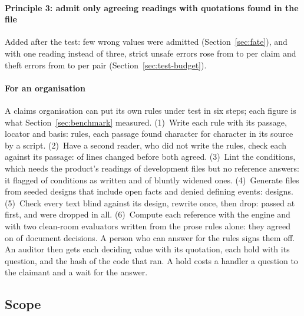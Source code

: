\paragraph{Principle 3: admit only agreeing readings with quotations found in the file}
Added after the test: few wrong values were admitted (Section~\ref{sec:fate}), and with one reading instead of three, strict unsafe errors rose from \sthreeFFourTenKThreeErrors{} to \sthreeFFourTenKOneErrors{} per claim and theft errors from \sthreeFFourThKThreeErrors{} to \sthreeFFourThKOneErrors{} per pair (Section~\ref{sec:test-budget}).

\paragraph{For an organisation}
A claims organisation can put its own rules under test in six steps; each figure is what Section~\ref{sec:benchmark} measured. (1)~Write each rule with its passage, locator and basis: \sfourdevAllRules{} rules, each passage found character for character in its source by a script. (2)~Have a second reader, who did not write the rules, check each against its passage: \sfourdevAllCheckNotAgree{} of \sfourdevAllCheckLines{} lines changed before both agreed. (3)~Lint the conditions, which needs the product's readings of development files but no reference answers: it flagged \sfourdevLintUntouchedFlagged{} of \sfourdevLintUntouched{} conditions as written and \sfourdevLintBluntDetected{} of \sfourdevLintBluntPlanted{} bluntly widened ones. (4)~Generate files from seeded designs that include open facts and denied defining events: \sfourdevAllDesigned{} designs. (5)~Check every text blind against its design, rewrite once, then drop: \sfourdevAllOneKept{} passed at first, and \sfourdevAllDropped{} were dropped in all. (6)~Compute each reference with the engine and with two clean-room evaluators written from the prose rules alone: they agreed on \sfourdevCleanroomSame{} of \sfourdevCleanroomDocuments{} document decisions. A person who can answer for the rules signs them off. An auditor then gets each deciding value with its quotation, each hold with its question, and the hash of the code that ran. A hold costs a handler a question to the claimant and a wait for the answer.

\subsection{Scope}
\label{sec:scope}

